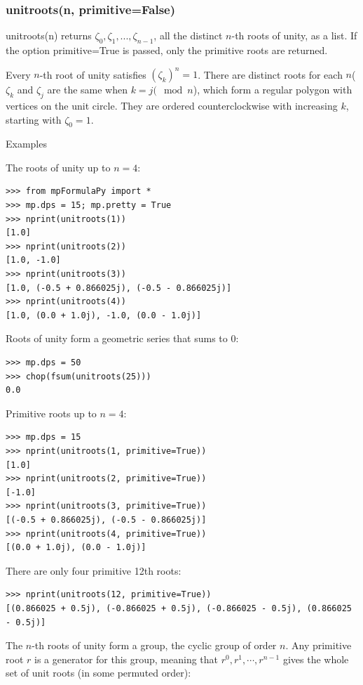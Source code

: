 \subsubsection{unitroots(n, primitive=False)}
unitroots(n) returns $\zeta_0, \zeta_1,...,\zeta_{n-1}$, all the distinct $n$-th roots of unity, as a list. If the option primitive=True is passed, only the primitive roots are returned.

\vpara
Every $n$-th root of unity satisfies $(\zeta_k)^n=1$. There are distinct roots for each $n$($\zeta_k$ and $\zeta_j$ are the same when $k=j (\mod n$), which form a regular polygon with vertices on the unit circle. They are ordered counterclockwise with increasing $k$, starting with $\zeta_0=1$.

\vpara
Examples

The roots of unity up to $n=4$:
\begin{lstlisting}
>>> from mpFormulaPy import *
>>> mp.dps = 15; mp.pretty = True
>>> nprint(unitroots(1))
[1.0]
>>> nprint(unitroots(2))
[1.0, -1.0]
>>> nprint(unitroots(3))
[1.0, (-0.5 + 0.866025j), (-0.5 - 0.866025j)]
>>> nprint(unitroots(4))
[1.0, (0.0 + 1.0j), -1.0, (0.0 - 1.0j)]
\end{lstlisting}



Roots of unity form a geometric series that sums to 0:
\begin{lstlisting}
>>> mp.dps = 50
>>> chop(fsum(unitroots(25)))
0.0
\end{lstlisting}

Primitive roots up to $n=4$:
\begin{lstlisting}
>>> mp.dps = 15
>>> nprint(unitroots(1, primitive=True))
[1.0]
>>> nprint(unitroots(2, primitive=True))
[-1.0]
>>> nprint(unitroots(3, primitive=True))
[(-0.5 + 0.866025j), (-0.5 - 0.866025j)]
>>> nprint(unitroots(4, primitive=True))
[(0.0 + 1.0j), (0.0 - 1.0j)]
\end{lstlisting}



There are only four primitive 12th roots:

\begin{lstlisting}
>>> nprint(unitroots(12, primitive=True))
[(0.866025 + 0.5j), (-0.866025 + 0.5j), (-0.866025 - 0.5j), (0.866025 - 0.5j)]
\end{lstlisting}

The $n$-th roots of unity form a group, the cyclic group of order $n$. Any primitive root $r$ is a
generator for this group, meaning that $r^0, r^1,\cdots, r^{n-1}$ gives the whole set of unit roots (in some permuted order):

